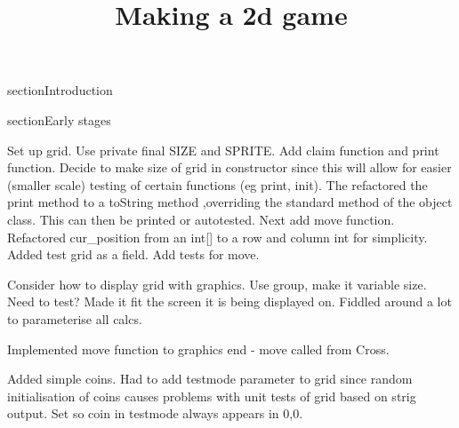 \documentclass{article}
\begin{document}
\title{Making a 2d game}
\maketitle

section{Introduction}

section{Early stages}

Set up grid. Use private final SIZE and SPRITE. Add claim function and print function. Decide to make size of grid
in constructor since this will allow for easier (smaller scale) testing of certain functions (eg print, init).
The refactored the print method to a toString method ,overriding the standard method of the object class. This
can then be printed or autotested. Next add move function. Refactored cur_position from an int[] to a row and
column int for simplicity. Added test grid as a field. Add tests for move.

Consider how to display grid with graphics. Use group, make it variable size. Need to test? Made it fit the screen
it is being displayed on. Fiddled around a lot to parameterise all calcs.

Implemented move function to graphics end - move called from Cross.

Added simple coins. Had to add testmode parameter to grid since random initialisation of coins causes problems with
unit tests of grid based on strig output. Set so coin in testmode always appears in 0,0.  
\end{document}
